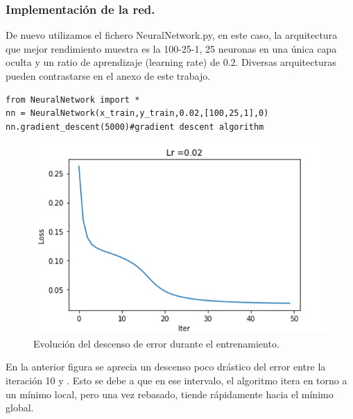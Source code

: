 \documentclass[a4paper,11pt]{article}
\begin{document}
\subsubsection{Implementación de la red.}
De nuevo utilizamos el fichero NeuralNetwork.py, en este caso, la  arquitectura  que mejor rendimiento muestra es la 100-25-1, 25 neuronas en una única capa oculta y un ratio de aprendizaje (learning rate) de 0.2. Diversas arquitecturas pueden contrastarse en el anexo de este trabajo.
\begin{lstlisting}
from NeuralNetwork import * 
nn = NeuralNetwork(x_train,y_train,0.02,[100,25,1],0)
nn.gradient_descent(5000)#gradient descent algorithm
\end{lstlisting}
\begin{figure}[H]
	\centering
	\includegraphics[scale=0.6]{Annotation 2020-03-23171823}
\caption{Evolución del descenso de error durante el entrenamiento.}
\end{figure}
\noindent
En la anterior figura se aprecia un descenso poco drástico del error entre la iteración 10 y . Esto se debe a que en ese intervalo, el algoritmo itera en torno a un mínimo local, pero una vez rebasado, tiende rápidamente hacia el mínimo global. 
\end{document}
